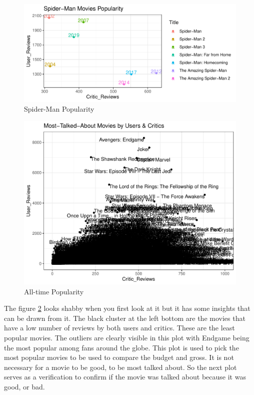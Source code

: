 \documentclass[11pt,a4paper,]{article}
\begin{document}
\begin{figure}[H]

{\centering \includegraphics{Report_files/figure-latex/SpiderManReview-1} 

}

\caption{Spider-Man Popularity}\label{fig:SpiderManReview}
\end{figure}

\begin{figure}[H]

{\centering \includegraphics{Report_files/figure-latex/AllReviewsPlot-1} 

}

\caption{All-time Popularity}\label{fig:AllReviewsPlot}
\end{figure}

The figure \ref{fig:AllReviewsPlot} looks shabby when you first look at it but it has some insights that can be drawn from it. The black cluster at the left bottom are the movies that have a low number of reviews by both users and critics. These are the least popular movies. The outliers are clearly visible in this plot with Endgame being the most popular among fans around the globe. This plot is used to pick the most popular movies to be used to compare the budget and gross. It is not necessary for a movie to be good, to be most talked about. So the next plot serves as a verification to confirm if the movie was talked about because it was good, or bad.
\end{document}
